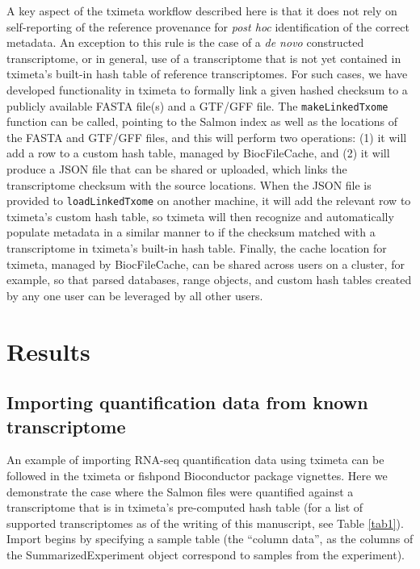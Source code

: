 \documentclass[12pt]{article} \usepackage[utf8]{inputenc}
\begin{document}
A key aspect of the tximeta workflow described here is that it does
not rely on self-reporting of the reference provenance for
\textit{post hoc} identification of the correct metadata. An exception
to this rule is the case of a \textit{de novo} constructed
transcriptome, or in general, use of a transcriptome that is not yet
contained in tximeta's built-in hash table of reference
transcriptomes. For such cases, we have developed functionality in
tximeta to formally link a given hashed checksum to a publicly
available FASTA file(s) and a GTF/GFF file. The
\texttt{makeLinkedTxome} function can be called, pointing to the
Salmon index as well as the locations of the FASTA and GTF/GFF files, and
this will perform two operations: (1) it will add a row to a custom hash
table, managed by BiocFileCache, and (2) it will produce a JSON file
that can be shared or uploaded, which links the transcriptome checksum
with the source locations. When the JSON file is provided to
\texttt{loadLinkedTxome} on another machine, it will add the relevant
row to tximeta's custom hash table, so tximeta will then recognize and
automatically populate metadata in a similar manner to if the checksum
matched with a transcriptome in tximeta's built-in hash
table. Finally, the cache location for tximeta, managed by
BiocFileCache, can be shared across users on a cluster, for example,
so that parsed databases, range objects, and custom hash tables
created by any one user can be leveraged by all other users.

\section*{Results}

\subsection*{Importing quantification data from known transcriptome}

An example of importing RNA-seq quantification data using tximeta can
be followed in the tximeta or fishpond Bioconductor package
vignettes. Here we demonstrate the case where the Salmon files were
quantified against a transcriptome that is in tximeta's pre-computed
hash table (for a list of supported transcriptomes as of the writing
of this manuscript, see Table \ref{tab1}). Import begins by specifying
a sample table (the ``column data'', as the columns of the
SummarizedExperiment object correspond to samples from the
experiment).
\end{document}
